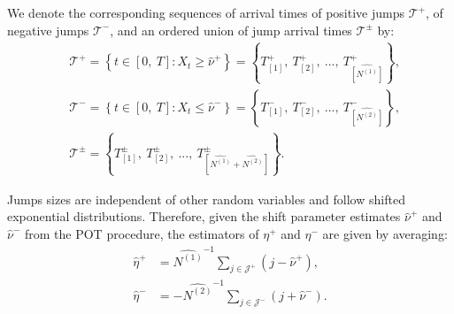 \documentclass[11pt,a4paper]{article}
\numberwithin{equation}{section}
\theoremstyle{remark}
\theoremstyle{definition}
\begin{document}
We denote the corresponding sequences of arrival times of positive jumps $\mathcal{T}^+$, of negative jumps $\mathcal{T}^-$, and an ordered union of jump arrival times $\mathcal{T}^{\pm}$ by:
\begin{equation}
    \begin{split}
& \mathcal{T}^+ = \left\{t \in [0,\ T]: X_t \geq \hat \nu^+ \right\} = \left\{T^+_{[1]},\ T^+_{[2]},\ ...,\ T^+_{\widehat{[N^{(1)}]}}\right\},\\
& \mathcal{T}^- = \left\{t \in [0,\ T]: X_t \leq \hat \nu^- \right\} = \left\{T^-_{[1]},\ T^-_{[2]},\ ...,\ T^-_{\widehat{[N^{(2)}]}}\right\},\\
& \mathcal{T}^{\pm} = \left\{T^{\pm}_{[1]},\ T^{\pm}_{[2]},\ ...,\ T^{\pm}_{[\widehat{N^{(1)}}+\widehat{N^{(2)}}]}\right\}.
    \end{split}
\end{equation}

Jumps sizes are independent of other random variables and follow shifted exponential distributions.
Therefore, given the shift parameter estimates $\widehat \nu^+$ and $\widehat \nu^-$ from the POT procedure, the estimators of $\eta^+$ and $\eta^-$ are given by averaging:
\begin{equation}\label{eq:mean_p_jumps_sizes}
    \begin{split}
\widehat \eta^+ &= \widehat{N^{(1)}}^{-1} \sum_{j \in \mathcal{J}^+}\left(j - \widehat \nu^+\right),\\
\widehat \eta^- &= -\widehat{N^{(2)}}^{-1} \sum_{j \in \mathcal{J}^-}\left(j + \widehat \nu^-\right).
    \end{split}
\end{equation}
\end{document}
